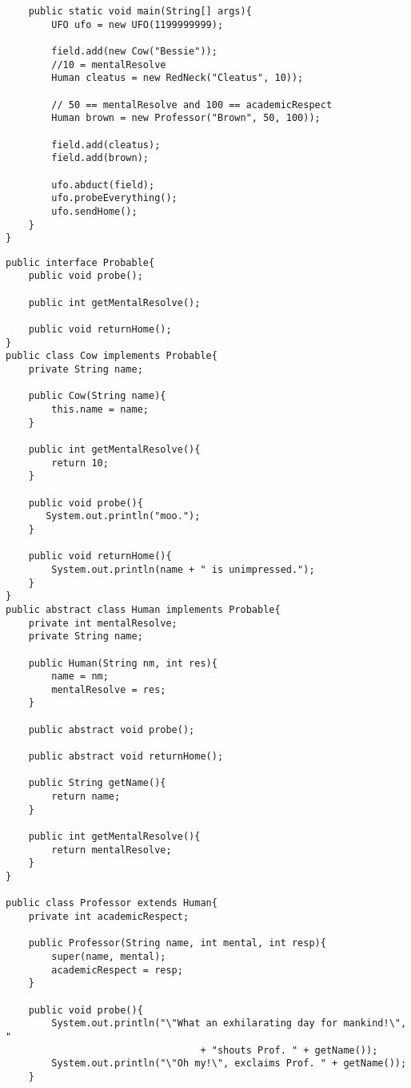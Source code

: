\documentclass[11pt]{article}
\newenvironment{answer}{\large\lstset{basicstyle=\large}\color{white}}{}
\newenvironment{answer}{\large\lstset{basicstyle=\large}\color{red}}{}
\begin{document}
\begin{enumerate}
\begin{lstlisting}
    public static void main(String[] args){
        UFO ufo = new UFO(1199999999);

        field.add(new Cow("Bessie"));
        //10 = mentalResolve
        Human cleatus = new RedNeck("Cleatus", 10));
        
        // 50 == mentalResolve and 100 == academicRespect
        Human brown = new Professor("Brown", 50, 100));         
        
        field.add(cleatus);
        field.add(brown);

        ufo.abduct(field);
        ufo.probeEverything();
        ufo.sendHome();
    }
}
\end{lstlisting}
\begin{answer}
\begin{lstlisting}
public interface Probable{
    public void probe();

    public int getMentalResolve();

    public void returnHome();
}
public class Cow implements Probable{
    private String name;

    public Cow(String name){
        this.name = name;
    }

    public int getMentalResolve(){
        return 10;
    }

    public void probe(){
       System.out.println("moo.");
    }

    public void returnHome(){
        System.out.println(name + " is unimpressed.");
    }
}
public abstract class Human implements Probable{
    private int mentalResolve;
    private String name;

    public Human(String nm, int res){
        name = nm;
        mentalResolve = res;
    }

    public abstract void probe();

    public abstract void returnHome();

    public String getName(){
        return name;
    }

    public int getMentalResolve(){
        return mentalResolve;
    }
}

public class Professor extends Human{
    private int academicRespect;

    public Professor(String name, int mental, int resp){
        super(name, mental);
        academicRespect = resp;
    }

    public void probe(){
        System.out.println("\"What an exhilarating day for mankind!\", "
                                  + "shouts Prof. " + getName());
        System.out.println("\"Oh my!\", exclaims Prof. " + getName());
    }


\end{lstlisting}
\end{answer}
\end{enumerate}
\end{document}
